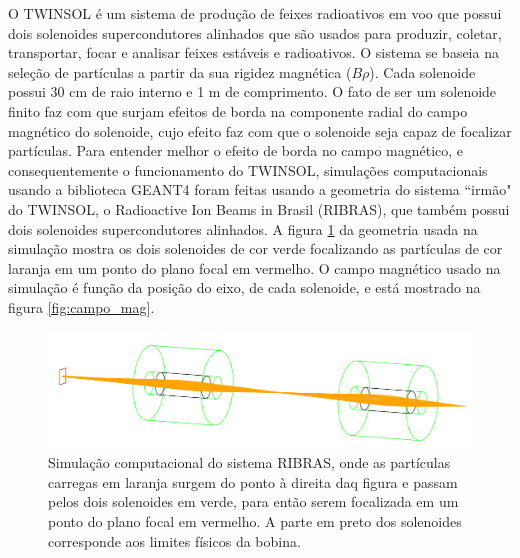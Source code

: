 \documentclass[a4paper,12pt,oneside]{book}
\begin{document}
\par O TWINSOL é um sistema de produção de feixes radioativos em voo que possui dois solenoides supercondutores alinhados que são usados para produzir, coletar, transportar, focar e analisar feixes estáveis e radioativos. O sistema se baseia na seleção de partículas a partir da sua rigidez magnética ($B\rho$)\cite{twinsol, ribras_leo, zamora_mater}. Cada solenoide possui 30 cm de raio interno e 1 m de comprimento\cite{twinsol}. O fato de ser um solenoide finito faz com que surjam efeitos de borda na componente radial do campo magnético do solenoide, cujo efeito faz com que o solenoide seja capaz de focalizar partículas. Para entender melhor o efeito de borda no campo magnético, e consequentemente o funcionamento do TWINSOL, simulações computacionais usando a biblioteca GEANT4\cite{geant4} foram feitas usando a geometria do sistema ``irmão" do TWINSOL, o Radioactive Ion Beams in Brasil (RIBRAS), que também possui dois solenoides supercondutores alinhados\cite{ribras_leo, ribras}. A figura \ref{fig:sim_ribras} da geometria usada na simulação mostra os dois solenoides de cor verde focalizando as partículas de cor laranja em um ponto do plano focal em vermelho. O campo magnético usado na simulação é função da posição do eixo, de cada solenoide, e está mostrado na figura \ref{fig:campo_mag}.



\begin{figure}[H]
    \centering
    \includegraphics[scale = 0.95]{figs/Foco2S.png}
    \caption{Simulação computacional do sistema RIBRAS, onde as partículas carregas em laranja surgem do ponto à direita daq figura e passam pelos dois solenoides em verde, para então serem focalizada em um ponto do plano focal em vermelho. A parte em preto dos solenoides corresponde aos limites físicos da bobina\cite{ribras_leo}.}
    \label{fig:sim_ribras}
\end{figure}
\end{document}
